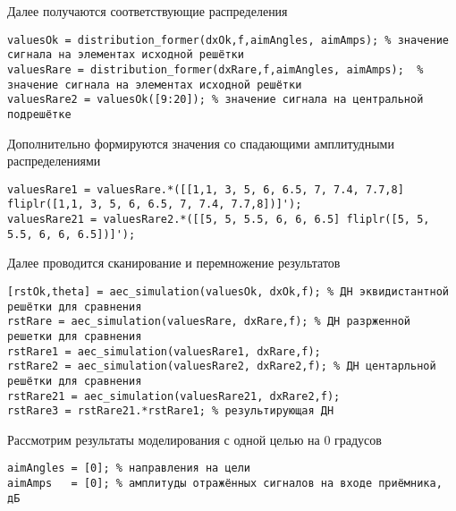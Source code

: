 Далее получаются соответствующие распределения

\begin{verbatim}
valuesOk = distribution_former(dxOk,f,aimAngles, aimAmps); % значение сигнала на элементах исходной решётки
valuesRare = distribution_former(dxRare,f,aimAngles, aimAmps);  % значение сигнала на элементах исходной решётки
valuesRare2 = valuesOk([9:20]); % значение сигнала на центральной подрешётке   
\end{verbatim}

Дополнительно формируются значения со спадающими амплитудными распределениями

\begin{verbatim}
valuesRare1 = valuesRare.*([[1,1, 3, 5, 6, 6.5, 7, 7.4, 7.7,8] fliplr([1,1, 3, 5, 6, 6.5, 7, 7.4, 7.7,8])]');
valuesRare21 = valuesRare2.*([[5, 5, 5.5, 6, 6, 6.5] fliplr([5, 5, 5.5, 6, 6, 6.5])]');
\end{verbatim}

Далее проводится сканирование и перемножение результатов


\begin{verbatim}
[rstOk,theta] = aec_simulation(valuesOk, dxOk,f); % ДН эквидистантной решётки для сравнения
rstRare = aec_simulation(valuesRare, dxRare,f); % ДН разрженной решетки для сравнения
rstRare1 = aec_simulation(valuesRare1, dxRare,f);
rstRare2 = aec_simulation(valuesRare2, dxRare2,f); % ДН центарльной решётки для сравнения
rstRare21 = aec_simulation(valuesRare21, dxRare2,f);
rstRare3 = rstRare21.*rstRare1; % результирующая ДН
\end{verbatim}

Рассмотрим результаты моделирования с одной целью на 0 градусов

\begin{verbatim}
aimAngles = [0]; % направления на цели
aimAmps   = [0]; % амплитуды отражённых сигналов на входе приёмника, дБ
\end{verbatim}